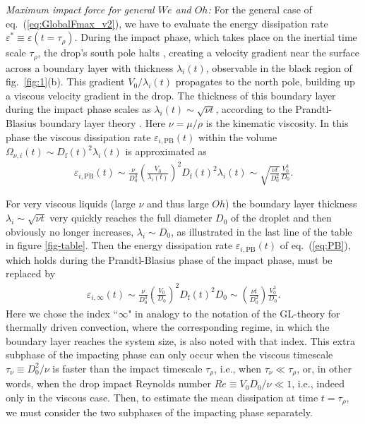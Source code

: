 \documentclass[preprint,amssymb,superscriptaddress,aps,prl,floatfix]{revtex4-1}
\newcommand{\oo}{\color{magenta} \normalfont}
\newcommand{\bb}{\color{black} \normalfont}
\begin{document}
{\it Maximum impact force for general $We$ and $Oh$:} 
For the general case 
of  eq.\ (\ref{eq:GlobalFmax_v2}),   
we have to evaluate  the energy 
dissipation rate
$\varepsilon^* \equiv \varepsilon(t = \tau_\rho)$. 
During the impact phase, which takes place on
the inertial time scale $\tau_\rho$,  the drop's south pole halts \cite{renardy2003pyramidal, Biance2006}, creating a velocity gradient near the surface across a boundary layer with thickness 
$\lambda_i(t)$, observable in the black region of fig.~\ref{fig:1}(b). This gradient $V_0/\lambda_i(t)$ propagates to the north pole, building up a  viscous velocity gradient in 
the drop. The thickness of this boundary layer during the impact phase 
scales as  $\lambda_i(t) \sim \sqrt{\nu t}$, 
according to the Prandtl-Blasius boundary layer theory \cite{Prandtl1905, Blasius1908,Schlichting1979}. 
Here $\nu = \mu /\rho$ is the kinematic viscosity. 
In this phase
the viscous dissipation rate $\varepsilon_{i, \text{PB}}(t)$ within the volume $\Omega_{\nu, i}(t) \sim D_{\text{f}}(t)^2\lambda_i(t)$
is approximated as 
\begin{align}
	\label{eq:PB}
	\varepsilon_{i,\text{PB}}(t) \sim \frac{\nu}{D_0^3}\left(\frac{V_0}{\lambda_i(t)}\right)^2D_{\text{f}}(t)^2\lambda_i(t) \sim \sqrt{\frac{\nu t}{D_0^2}}\frac{V_0^3}{D_0}.
\end{align}


For very viscous liquids (large $\nu$ and thus large 
$Oh$) the boundary layer thickness $\lambda_i \sim \sqrt{\nu t}$  very quickly reaches the full diameter $D_0$
of the droplet and then obviously no longer increases, $\lambda_i \sim D_0$, as illustrated in the last line of 
the table
in figure \ref{fig-table}. 
Then the energy dissipation rate $\varepsilon_{i,\text{PB}}(t)$
of eq.\ (\ref{eq:PB}), which holds during the Prandtl-Blasius 
phase of the impact phase, must be replaced by 
\begin{align}
	\label{eq:infty}
	\varepsilon_{i,\infty}(t) \sim \frac{\nu}{D_0^3}\left(\frac{V_0}{D_0 }\right)^2D_{\text{f}}(t)^2 D_0 \sim \left(\frac{\nu t}{D_0^2}\right)\frac{V_0^3}{D_0}.
\end{align}
Here we chose the index ``$\infty$" in analogy to the notation of the
GL-theory for thermally driven convection, where the corresponding regime, in which the boundary layer reaches the system size, is also noted with that index. 
This extra subphase  of the impacting phase can only occur when 
the 
viscous timescale $\tau_\nu \equiv D_0^2/\nu$
is faster than the impact timescale $\tau_\rho$,
i.e., when $\tau_\nu \ll \tau_\rho$, or, in other
words, when the drop impact 
  Reynolds number   $Re \equiv V_0D_0/\nu \ll   1$, i.e., indeed only in the
  viscous case. Then, to estimate the mean dissipation at time $t = \tau_\rho$, we must consider the two subphases of the impacting phase 
  separately.  
\end{document}
